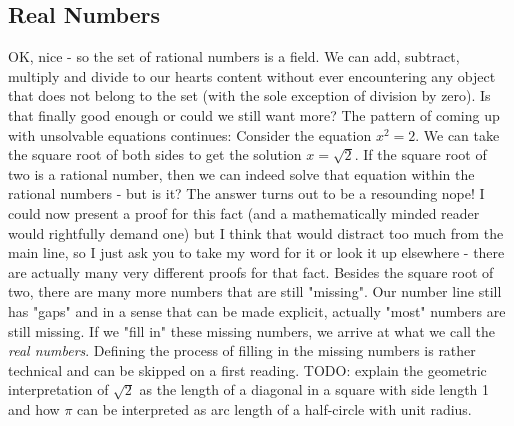 








\subsection{Real Numbers}
OK, nice - so the set of rational numbers is a field. We can add, subtract, multiply and divide to our hearts content without ever encountering any object that does not belong to the set (with the sole exception of division by zero). Is that finally good enough or could we still want more? The pattern of coming up with unsolvable equations continues: Consider the equation $x^2 = 2$. We can take the square root of both sides to get the solution $x = \sqrt{2}$. If the square root of two is a rational number, then we can indeed solve that equation within the rational numbers - but is it? The answer turns out to be a resounding nope! I could now present a proof for this fact (and a mathematically minded reader would rightfully demand one) but I think that would distract too much from the main line, so I just ask you to take my word for it or look it up elsewhere - there are actually many very different proofs for that fact. Besides the square root of two, there are many more numbers that are still "missing". Our number line still has "gaps" and in a sense that can be made explicit, actually "most" numbers are still missing. If we "fill in" these missing numbers, we arrive at what we call the \emph{real numbers}. Defining the process of filling in the missing numbers is rather technical and can be skipped on a first reading. TODO: explain the geometric interpretation of $\sqrt{2}$ as the length of a diagonal in a square with side length 1 and how $\pi$ can be interpreted as arc length of a half-circle with unit radius.

